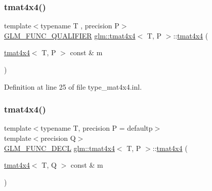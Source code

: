\subsubsection{\texorpdfstring{tmat4x4()}{tmat4x4()}\hspace{0.1cm}{\footnotesize\ttfamily [2/22]}}
{\footnotesize\ttfamily template$<$typename T , precision P$>$ \\
\mbox{\hyperlink{setup_8hpp_a33fdea6f91c5f834105f7415e2a64407}{G\+L\+M\+\_\+\+F\+U\+N\+C\+\_\+\+Q\+U\+A\+L\+I\+F\+I\+ER}} \mbox{\hyperlink{structglm_1_1tmat4x4}{glm\+::tmat4x4}}$<$ T, P $>$\+::\mbox{\hyperlink{structglm_1_1tmat4x4}{tmat4x4}} (\begin{DoxyParamCaption}\item[{\mbox{\hyperlink{structglm_1_1tmat4x4}{tmat4x4}}$<$ T, P $>$ const \&}]{m }\end{DoxyParamCaption})}



Definition at line 25 of file type\+\_\+mat4x4.\+inl.

\mbox{\label{structglm_1_1tmat4x4_a17b8d6a39ce1d3568f8164f66217ae07}} 
\subsubsection{\texorpdfstring{tmat4x4()}{tmat4x4()}\hspace{0.1cm}{\footnotesize\ttfamily [3/22]}}
{\footnotesize\ttfamily template$<$typename T, precision P = defaultp$>$ \\
template$<$precision Q$>$ \\
\mbox{\hyperlink{setup_8hpp_ab2d052de21a70539923e9bcbf6e83a51}{G\+L\+M\+\_\+\+F\+U\+N\+C\+\_\+\+D\+E\+CL}} \mbox{\hyperlink{structglm_1_1tmat4x4}{glm\+::tmat4x4}}$<$ T, P $>$\+::\mbox{\hyperlink{structglm_1_1tmat4x4}{tmat4x4}} (\begin{DoxyParamCaption}\item[{\mbox{\hyperlink{structglm_1_1tmat4x4}{tmat4x4}}$<$ T, Q $>$ const \&}]{m }\end{DoxyParamCaption})}

\mbox{\label{structglm_1_1tmat4x4_a657bf854bdbd47d50e512a263804f394}} 
